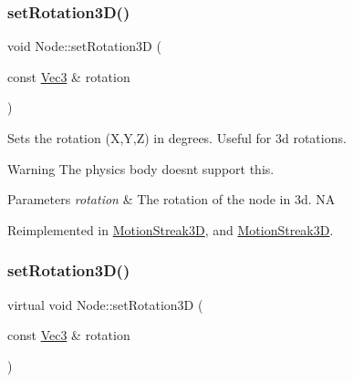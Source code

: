 \mbox{\label{classNode_a2ce988bebd6c8b804d8bfdfafd511c40}} 
\subsubsection{\texorpdfstring{set\+Rotation3\+D()}{setRotation3D()}\hspace{0.1cm}{\footnotesize\ttfamily [1/2]}}
{\footnotesize\ttfamily void Node\+::set\+Rotation3D (\begin{DoxyParamCaption}\item[{const \hyperlink{classVec3}{Vec3} \&}]{rotation }\end{DoxyParamCaption})\hspace{0.3cm}{\ttfamily [virtual]}}

Sets the rotation (X,Y,Z) in degrees. Useful for 3d rotations.

\begin{DoxyWarning}{Warning}
The physics body doesn\textquotesingle{}t support this.
\end{DoxyWarning}

\begin{DoxyParams}{Parameters}
{\em rotation} & The rotation of the node in 3d.  NA \\
\hline
\end{DoxyParams}


Reimplemented in \hyperlink{classMotionStreak3D_a6ef719a2412711e81c3bfc40ce53c3e2}{Motion\+Streak3D}, and \hyperlink{classMotionStreak3D_abe4bc651d6ce068c366edc18cb0aaead}{Motion\+Streak3D}.

\mbox{\label{classNode_ad53b989e70e96a62f2aabaa26094f4b0}} 
\subsubsection{\texorpdfstring{set\+Rotation3\+D()}{setRotation3D()}\hspace{0.1cm}{\footnotesize\ttfamily [2/2]}}
{\footnotesize\ttfamily virtual void Node\+::set\+Rotation3D (\begin{DoxyParamCaption}\item[{const \hyperlink{classVec3}{Vec3} \&}]{rotation }\end{DoxyParamCaption})\hspace{0.3cm}{\ttfamily [virtual]}}

